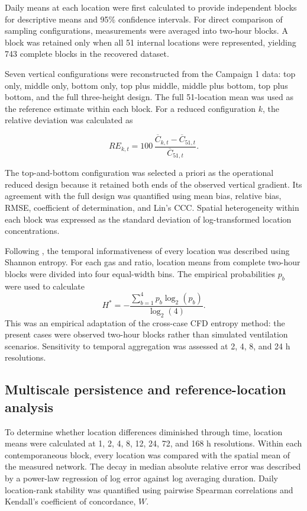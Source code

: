 \documentclass[12pt,a4paper]{article}
\begin{document}
Daily means at each location were first calculated to provide independent
blocks for descriptive means and 95\% confidence intervals. For direct
comparison of sampling configurations, measurements were averaged into
two-hour blocks. A block was retained only when all 51 internal locations
were represented, yielding 743 complete blocks in the recovered dataset.

Seven vertical configurations were reconstructed from the Campaign 1 data:
top only, middle only, bottom only, top plus middle, middle plus bottom, top
plus bottom, and the full three-height design. The full 51-location mean was
used as the reference estimate within each block. For a reduced configuration
\(k\), the relative deviation was calculated as

\begin{equation}
RE_{k,t}=100\,
\frac{\overline{C}_{k,t}-\overline{C}_{51,t}}
     {\overline{C}_{51,t}}.
\end{equation}

The top-and-bottom configuration was selected a priori as the operational
reduced design because it retained both ends of the observed vertical
gradient. Its agreement with the full design was quantified using mean bias,
relative bias, RMSE, coefficient of determination, and Lin's CCC. Spatial
heterogeneity within each block was expressed as the standard deviation of
log-transformed location concentrations.

Following \citet{Chen2026}, the temporal informativeness of every location was
described using Shannon entropy. For each gas and ratio, location means from
complete two-hour blocks were divided into four equal-width bins. The
empirical probabilities \(p_b\) were used to calculate
\begin{equation}
H^*=-\frac{\sum_{b=1}^{4}p_b\log_2(p_b)}{\log_2(4)}.
\end{equation}
This was an empirical adaptation of the cross-case CFD entropy method: the
present cases were observed two-hour blocks rather than simulated ventilation
scenarios. Sensitivity to temporal aggregation was assessed at 2, 4, 8, and
24 h resolutions.

\subsection{Multiscale persistence and reference-location analysis}

To determine whether location differences diminished through time, location
means were calculated at 1, 2, 4, 8, 12, 24, 72, and 168 h resolutions. Within
each contemporaneous block, every location was compared with the spatial mean
of the measured network. The decay in median absolute relative error was
described by a power-law regression of log error against log averaging
duration. Daily location-rank stability was quantified using pairwise Spearman
correlations and Kendall's coefficient of concordance, \(W\).
\end{document}
